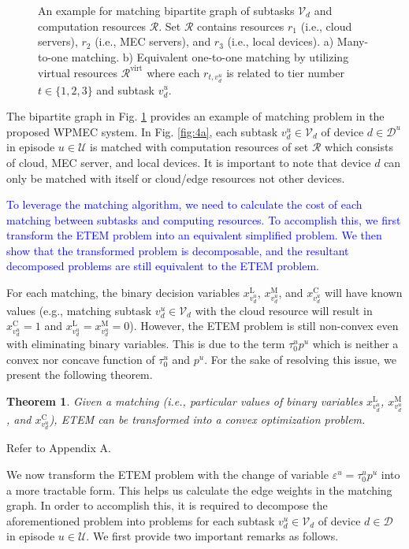 \documentclass[12pt,draftclsnofoot,onecolumn]{IEEEtran}
\newtheorem{theorem}{Theorem}
\begin{document}
\begin{figure}[ht]
	\caption{An example for matching bipartite graph of subtasks $\mathcal{V}_d$ and computation resources $\mathcal{R}$. Set $\mathcal{R}$ contains resources $r_1$ (i.e., cloud servers), $r_2$ (i.e., MEC servers), and $r_3$ (i.e., local devices). a) Many-to-one matching. b) Equivalent one-to-one matching by utilizing virtual resources $\mathcal{R}^{\text{virt}}$ where each $r_{t,v_d^u}$ is related to tier number $t\in\{1,2,3\}$ and subtask $v_d^u$.} \label{fig:4}
\end{figure}

The bipartite graph in Fig. \ref{fig:4} provides an example of matching problem in the proposed WPMEC system. In Fig. \ref{fig:4a}, each subtask $v_d^u\in\mathcal{V}_d$ of device $d\in\mathcal{D}^u$ in episode $u\in\mathcal{U}$ is matched with computation resources of set $\mathcal{R}$ which consists of cloud, MEC server, and local devices. It is important to note that device $d$ can only be matched with itself or cloud/edge resources not other devices.

\textcolor{blue}{To leverage the matching algorithm, we need to calculate the cost of each matching between subtasks and computing resources. To accomplish this, we first transform the ETEM problem into an equivalent simplified problem. We then show that the transformed problem is decomposable, and the resultant decomposed problems are still equivalent to the ETEM problem.}

For each matching, the binary decision variables $x_{v_d^u}^{\text{L}}$, $x_{v_d^u}^{\text{M}}$, and $x_{v_d^u}^{\text{C}}$ will have known values (e.g., matching subtask $v_d^u\in\mathcal{V}_d$ with the cloud resource will result in $x_{v_d^u}^{\text{C}} = 1$ and $x_{v_d^u}^{\text{L}}=x_{v_d^u}^{\text{M}}=0$). However, the ETEM problem is still non-convex even with eliminating binary variables. This is due to the term $\tau_0^up^u$ which is neither a convex nor concave function of $\tau_0^u$ and $p^u$. For the sake of resolving this issue, we present the following theorem.

\begin{theorem}
	Given a matching (i.e., particular values of binary variables $x^{\text{L}}_{v_d^u}$, $x^{\text{M}}_{v_d^u}$, and $x^{\text{C}}_{v_d^u}$), ETEM can be transformed into a convex optimization problem.
\end{theorem}
\begin{IEEEproof}
	Refer to Appendix A.
\end{IEEEproof}

We now transform the ETEM problem with the change of variable $\varepsilon^u=\tau_0^up^u$ into a more tractable form. This helps us calculate the edge weights in the matching graph. In order to accomplish this, it is required to decompose the aforementioned problem into problems for each subtask $v_d^u\in\mathcal{V}_d$ of device $d\in\mathcal{D}$ in episode $u\in\mathcal{U}$. We first provide two important remarks as follows.
\end{document}
